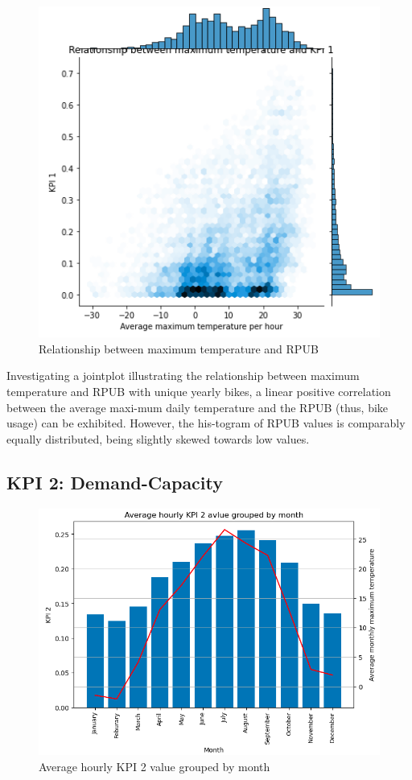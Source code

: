\begin{figure}[H]
   \centering
    \includegraphics[width=0.8\linewidth]{./Figures/APP2.png}
    \caption{Relationship between maximum temperature and RPUB}
    \label{APP2}
\end{figure}

Investigating a jointplot illustrating the relationship between maximum temperature and RPUB with unique yearly bikes, a linear positive correlation between the average maxi-mum daily temperature and the RPUB (thus, bike usage) can be exhibited. However, the his-togram of RPUB values is comparably equally distributed, being slightly skewed towards low values.

\subsection{KPI 2: Demand-Capacity}
\label{app:A4}

\begin{figure}[H]
   \centering
    \includegraphics[width=0.8\linewidth]{./Figures/kpi2abb2.png}
    \caption{Average hourly KPI 2 value grouped by month}
    \label{kpi2abb2}
\end{figure}

